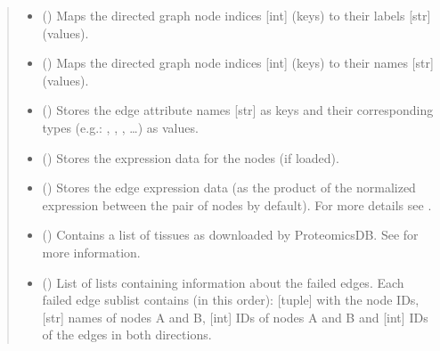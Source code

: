 \documentclass[letterpaper,10pt,english]{sphinxmanual}
\begin{document}
\begin{fulllineitems}
\begin{quote}
\begin{description}
\begin{itemize}
\item {} 
 () \textendash{} Maps the directed graph node indices {[}int{]} (keys) to their
labels {[}str{]} (values).

\item {} 
 () \textendash{} Maps the directed graph node indices {[}int{]} (keys) to their names
{[}str{]} (values).

\item {} 
 () \textendash{} Stores the edge attribute names {[}str{]} as keys and their
corresponding types (e.g.: , , , …) as
values.

\item {} 
 () \textendash{} Stores the expression data for the nodes (if loaded).

\item {} 
 () \textendash{} Stores the edge expression data (as the product of the
normalized expression between the pair of nodes by default). For
more details see {\hyperref[\detokenize{reference:pypath.main.PyPath.edges_expression}]{}}.

\item {} 
 () \textendash{} Contains a list of tissues as downloaded by ProteomicsDB. See
{\hyperref[\detokenize{reference:pypath.main.PyPath.get_proteomicsdb}]{}} for more information.

\item {} 
 () \textendash{} List of lists containing information about the failed edges.
Each failed edge sublist contains (in this order): {[}tuple{]} with
the node IDs, {[}str{]} names of nodes A and B, {[}int{]} IDs of nodes
A and B and {[}int{]} IDs of the edges in both directions.


\end{itemize}
\end{description}
\end{quote}
\end{fulllineitems}
\end{document}
